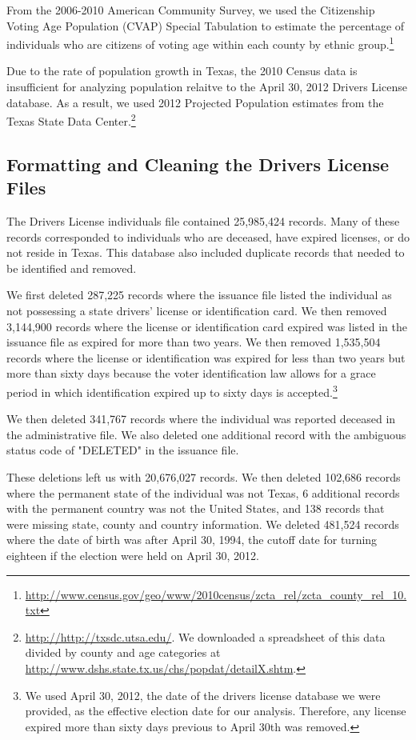 \documentclass[12pt]{article}
\begin{document}
From the 2006-2010 American Community Survey, we used the Citizenship Voting Age Population (CVAP) Special Tabulation to estimate the percentage of individuals who are citizens of voting age within each county by ethnic group.\footnote{\url{http://www.census.gov/geo/www/2010census/zcta_rel/zcta_county_rel_10.txt}}

Due to the rate of population growth in Texas, the 2010 Census data is insufficient for analyzing population relaitve to the April 30, 2012 Drivers License database.  As a result, we used 2012 Projected Population estimates from the Texas State Data Center.\footnote{\url{http://http://txsdc.utsa.edu/}.  We downloaded a spreadsheet of this data divided by county and age categories at \url{http://www.dshs.state.tx.us/chs/popdat/detailX.shtm}.}

\subsection{Formatting and Cleaning the Drivers License Files}
The Drivers License individuals file contained 25,985,424 records.  Many of these records corresponded to individuals who are deceased, have expired licenses, or do not reside in Texas.  This database also included duplicate records that needed to be identified and removed.

We first deleted 287,225 records where the issuance file listed the individual as not possessing a state drivers' license or identification card.  We then removed 3,144,900 records where the license or identification card expired was listed in the issuance file as expired for more than two years.  We then removed 1,535,504 records where the license or identification was expired for less than two years but more than sixty days because the voter identification law allows for a grace period in which identification expired up to sixty days is accepted.\footnote{We used April 30, 2012, the date of the drivers license database we were provided, as the effective election date for our analysis.  Therefore, any license expired more than sixty days previous to April 30th was removed.}

We then deleted 341,767 records where the individual was reported deceased in the administrative file.  We also deleted one additional record with the ambiguous status code of "DELETED" in the issuance file.

These deletions left us with 20,676,027 records.  We then deleted 102,686 records where the permanent state of the individual was not Texas, 6 additional records with the permanent country was not the United States, and 138 records that were missing state, county and country information.  We deleted 481,524 records where the date of birth was after April 30, 1994, the cutoff date for turning eighteen if the election were held on April 30, 2012.
\end{document}

